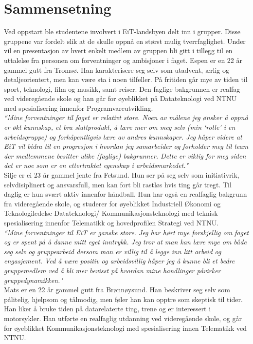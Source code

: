 \section{Sammensetning}
\label{sec:sammensetning}
Ved oppstart ble studentene involvert i EiT-landsbyen delt inn i grupper. Disse gruppene var fordelt slik at de skulle oppnå en størst mulig tverrfaglighet. Under vil en presentasjon av hvert enkelt medlem av gruppen bli gitt i tillegg til en uttalelse fra personen om forventninger og ambisjoner i faget.
Espen er en 22 år gammel gutt fra Tromsø. Han karakterisere seg selv som utadvent, ærlig og detaljeorientert, men kan være sta i noen tilfeller. På fritiden går mye av tiden til sport, teknologi, film og musikk, samt reiser. Den faglige bakgrunnen er realfag ved videregående skole og han går for øyeblikket på Datateknologi ved NTNU med spesialisering innenfor Programvareutvikling.\\

\textit{``Mine forventninger til faget er relativt store. Noen av målene jeg ønsker å oppnå er økt kunnskap, et bra sluttprodukt, å lære mer om meg selv (min `rolle' i en arbeidsgruppe) og forhåpentligvis lære av andres kunnskaper. Jeg håper videre at EiT vil bidra til en progresjon i hvordan jeg samarbeider og forholder meg til team der medlemmene besitter ulike (faglige) bakgrunner. Dette er viktig for meg siden det er noe som er en ettertraktet egenskap i arbeidsmarkedet."}\\

Silje er ei 23 år gammel jente fra Fetsund. Hun ser på seg selv som initiativrik, selvdisiplinert og ansvarsfull, men kan fort bli rastløs hvis ting går tregt. Til daglig er hun svært aktiv innenfor håndball. Hun har også en realfaglig bakgrunn fra videregående skole, og studerer for øyeblikket Industriell Økonomi og Teknologiledelse Datateknologi/ Kommunikasjonsteknologi med teknisk spesialisering innenfor Telematikk og hovedprofilen Strategi ved NTNU.\\

\textit{``Mine forventninger til EiT er ganske store. Jeg har hørt mye forskjellig om faget og er spent på å danne mitt eget inntrykk. Jeg tror at man kan lære mye om både seg selv og gruppearbeid dersom man er villig til å legge inn litt arbeid og engasjement. Ved å være positiv og arbeidsvillig håper jeg å kunne bli et bedre gruppemedlem ved å bli mer bevisst på hvordan mine handlinger påvirker gruppedynamikken."}\\

Mats er en 22 år gammel gutt fra Brønnøysund. Han beskriver seg selv som pålitelig, hjelpsom og tålmodig, men føler han kan opptre som skeptisk til tider. Han liker å bruke tiden på datarelaterte ting, trene og er interessert i motorsykler. Han utførte en realfaglig utdanning ved videregående skole, og går for øyeblikket Kommunikasjonsteknologi med spesialisering innen Telematikk ved NTNU.\\


